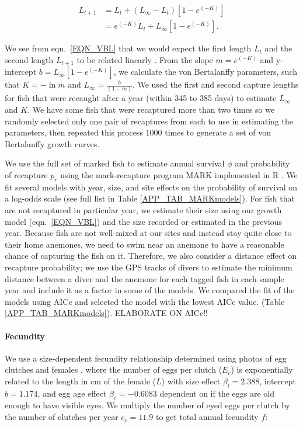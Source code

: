 \documentclass[12pt, oneside]{article}   	%
\begin{document}
\begin{equation} \label{EQN_VBL} 
\begin{split}
L_{t+1} & = L_t + (L_\infty - L_t)[1 - e^{(-K)}] \\
 & = e^{(-K)}L_t + L_\infty[1 - e^{(-K)}].
\end{split}
\end{equation}

We see from eqn.\ \ref{EQN_VBL} that we would expect the first length $L_t$ and the second length $L_{t+1}$ to be related linearly \citep{hart2009estimating}. From the slope $m = e^{(-K)}$ and y-intercept $b =  L_\infty[1 - e^{(-K)}]$, we calculate the von Bertalanffy parameters, such that $K = -\ln m$ and $L_\infty = \frac{b}{(1-m)}$. We used the first and second capture lengths for fish that were recaught after a year (within 345 to 385 days) to estimate $L_\infty$ and $K$. We have some fish that were recaptured more than two times so we randomly selected only one pair of recaptures from each to use in estimating the parameters, then repeated this process 1000 times to generate a set of von Bertalanffy growth curves. 

We use the full set of marked fish to estimate annual survival $\phi$ and probability of recapture $p_r$ using the mark-recapture program MARK implemented in R \citep{RMark_Laake2013}. We fit several models with year, size, and site effects on the probability of survival on a log-odds scale (see full list in Table \ref{APP_TAB_MARKmodels}). For fish that are not recaptured in particular year, we estimate their size using our growth model (eqn.\ \ref{EQN_VBL}) and the size recorded or estimated in the previous year. Because fish are not well-mixed at our sites and instead stay quite close to their home anemones, we need to swim near an anemone to have a reasonable chance of capturing the fish on it. Therefore, we also consider a distance effect on recapture probability; we use the GPS tracks of divers to estimate the minimum distance between a diver and the anemone for each tagged fish in each sample year and include it as a factor in some of the models. We compared the fit of the models using AICc and selected the model with the lowest AICc value. (Table \ref{APP_TAB_MARKmodels}). ELABORATE ON AICc!!

\paragraph*{Fecundity}

We use a size-dependent fecundity relationship determined using photos of egg clutches and females \citep{yawdoszynInPrepfecundity}, where the number of eggs per clutch ($E_c$) is exponentially related to the length in cm of the female ($L$) with size effect $\beta_l = 2.388$, intercept $b = 1.174$, and egg age effect $\beta_e = -0.6083$ dependent on if the eggs are old enough to have visible eyes. We multiply the number of eyed eggs per clutch by the number of clutches per year $c_e = 11.9$ \citep[estimate from][]{holtswarth2017fecundity} to get total annual fecundity $f$:
\end{document}
